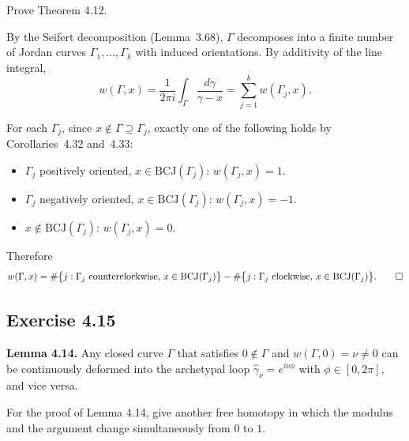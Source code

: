 \documentclass{article}
\begin{document}
Prove Theorem 4.12.

\begin{solution}
  By the Seifert decomposition (Lemma~3.68), $\Gamma$ decomposes into
  a finite number of Jordan curves $\Gamma_1, \ldots, \Gamma_k$
  with induced orientations.
  By additivity of the line integral,
  \[
    w(\Gamma, x)
    = \frac{1}{2\pi i}\int_\Gamma \frac{d\gamma}{\gamma - x}
    = \sum_{j=1}^{k} w(\Gamma_j, x).
  \]

  For each $\Gamma_j$, since $x \notin \Gamma \supseteq \Gamma_j$,
  exactly one of the following holds by Corollaries~4.32 and~4.33:
  \begin{itemize}
    \item $\Gamma_j$ positively oriented, $x \in \mathrm{BCJ}(\Gamma_j)$:
      $w(\Gamma_j, x) = 1$.
    \item $\Gamma_j$ negatively oriented, $x \in \mathrm{BCJ}(\Gamma_j)$:
      $w(\Gamma_j, x) = -1$.
    \item $x \notin \mathrm{BCJ}(\Gamma_j)$:
      $w(\Gamma_j, x) = 0$.
  \end{itemize}
  Therefore
  \[
    w(\Gamma, x)
    = \#\bigl\{j : \text{$\Gamma_j$ counterclockwise, }
      x \in \mathrm{BCJ}(\Gamma_j)\bigr\}
    - \#\bigl\{j : \text{$\Gamma_j$ clockwise, }
      x \in \mathrm{BCJ}(\Gamma_j)\bigr\}.\qedhere
  \]
\end{solution}

\subsection{Exercise 4.15}

\textbf{Lemma 4.14.}
Any closed curve $\Gamma$ that satisfies $0 \notin \Gamma$ and
$w(\Gamma, 0) = \nu \ne 0$ can be continuously deformed into the
archetypal loop $\hat{\gamma}_\nu = e^{i\nu\phi}$ with
$\phi \in [0, 2\pi]$, and vice versa.

For the proof of Lemma 4.14, give another free homotopy in which the
modulus and the argument change simultaneously from $0$ to $1$.
\end{document}
